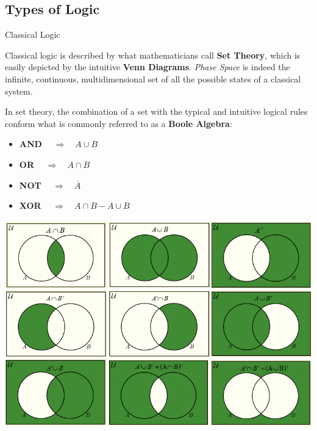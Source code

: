 \documentclass[9pt, handout, aspectratio=169]{beamer}	%
\begin{document}
	\subsection{Types of Logic}

	\begin{frame}{Classical Logic}

		Classical logic is described by what mathematicians call \textbf{Set Theory}, which is easily depicted by the intuitive \textbf{Venn Diagrams}. \emph{Phase Space} is indeed the infinite, continuous, multidimensional set of all the possible states of a classical system.

		\medskip

		In set theory, the combination of a set with the typical and intuitive logical rules conform what is commonly referred to as a \textbf{Boole Algebra}:

		\begin{multicols}{2}

		\begin{itemize}
			\item \textbf{AND} $\quad \Rightarrow \quad A \cup B$
			\item \textbf{OR} $\quad \Rightarrow \quad A \cap B$
			\item \textbf{NOT} $\quad \Rightarrow \quad \overline{A}$
			\item \textbf{XOR} $ \quad \Rightarrow \quad A \cap B - A \cup B$
		\end{itemize}

			\columnbreak
			\begin{center}
		\includegraphics[width=.34\paperwidth]{Figures/Venn_Diagrams}
			\end{center}

		\end{multicols}

	\end{frame}
\end{document}
